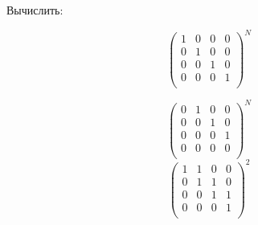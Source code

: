 
\usepackage{amsmath}


		{}
	
	\begin{problem}{
		Вычислить:
	}\end{problem}
	$$
	\begin{pmatrix}
		1 & 0 & 0 & 0 \\
		0 & 1 & 0 & 0 \\
		0 & 0 & 1 & 0 \\
		0 & 0 & 0 & 1 \\
	\end{pmatrix}^N
	$$
	
	$$
	\begin{pmatrix}
			0 & 1 & 0 & 0 \\
			0 & 0 & 1 & 0 \\
			0 & 0 & 0 & 1 \\
			0 & 0 & 0 & 0 \\
		\end{pmatrix}^N
	$$
	$$
	\begin{pmatrix}
		1 & 1 & 0 & 0 \\
		0 & 1 & 1 & 0 \\
		0 & 0 & 1 & 1 \\
		0 & 0 & 0 & 1 \\
	\end{pmatrix}^2
	$$
	


